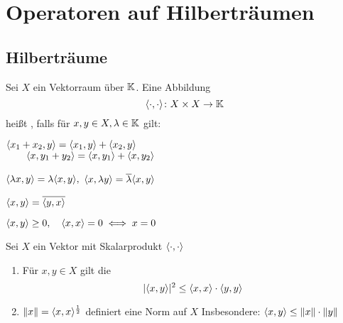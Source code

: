 

\chapter*{Operatoren auf Hilberträumen}  \setcounter{section}{14}



\section{Hilberträume}



\begin{definition} \label{def:15.1-Skalarprodukt}
	Sei $X$ ein Vektorraum über $\mathbb{K}$. Eine Abbildung
	\[ \langle \cdot, \cdot \rangle \colon X \times X \rightarrow \mathbb{K} \]
	hei{\ss}t , falls für $x, y \in X, \lambda \in \mathbb{K}$ gilt:
	\begin{description}
	 	\label{def:15.1i}
	 	\item[$\hspace{0.5cm} (S1) \hspace{0.1cm} $] $\langle x_{1} + x_{2}, y \rangle = \langle x_{1}, y \rangle + \langle x_{2}, y \rangle$ \\
			 $~\hspace{0.6cm} \langle x, y_{1} + y_{2} \rangle = \langle x, y_{1} \rangle + \langle x, y_{2} \rangle$
 		\label{def:15.1ii}
	 	\item[$\hspace{0.5cm} (S2) \hspace{0.1cm} $] $\langle \lambda x, y \rangle = \lambda \langle x, y \rangle,$ $\langle x, \lambda y \rangle = \overline{\lambda} \langle x, y \rangle$
 		\label{def:15.1iii}
	 	\item[$\hspace{0.5cm} (S3) \hspace{0.1cm} $] $\langle x, y \rangle = \overline{\langle y, x \rangle }$
 		\label{def:15.1iv}
	 	\item[$\hspace{0.5cm} (S4) \hspace{0.1cm} $] $\langle x, y \rangle \geq 0, \quad \langle x, x \rangle = 0 \iff x = 0$
	\end{description}
\end{definition}


\begin{prop} \label{prop:15.2}
	Sei $X$ ein Vektor mit Skalarprodukt $\langle \cdot, \cdot \rangle$
	\begin{enumerate}[label=\alph*\upshape)] \label{prop:15.2a}
		\item Für $x, y \in X$ gilt die 
			\[ | \langle x, y \rangle |^{2} \leq \langle x, x \rangle \cdot \langle y, y \rangle \] \label{prop:15.2b}
		\item $\| x \| = \langle x, x \rangle^{\frac{1}{2}}$ definiert eine Norm auf $X$
			Insbesondere: $\langle x, y \rangle \leq \| x \| \cdot \| y \|$
	\end{enumerate}	
\end{prop}

